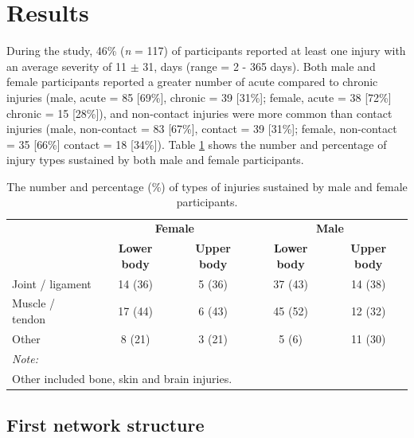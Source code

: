 \documentclass[
  english,
  man]{apa6}
\begin{document}
\hypertarget{results}{%
\section{Results}\label{results}}

During the study, 46\% (\emph{n} = 117) of participants reported at least one injury with an average severity of 11 \(\pm\) 31, days (range = 2 - 365 days).
Both male and female participants reported a greater number of acute compared to chronic injuries (male, acute = 85 {[}69\%{]}, chronic = 39 {[}31\%{]}; female, acute = 38 {[}72\%{]} chronic = 15 {[}28\%{]}), and non-contact injuries were more common than contact injuries (male, non-contact = 83 {[}67\%{]}, contact = 39 {[}31\%{]}; female, non-contact = 35 {[}66\%{]} contact = 18 {[}34\%{]}).
Table \ref{tab:table4} shows the number and percentage of injury types sustained by both male and female participants.

\begin{table}[H]

\caption{\label{tab:table4}The number and percentage (\%) of types of injuries sustained by male and female participants.}
\centering
\begin{tabular}[t]{l|c|c|c|c}
\hline
\multicolumn{1}{c|}{\textbf{ }} & \multicolumn{2}{c|}{\textbf{Female}} & \multicolumn{2}{c}{\textbf{Male}} \\
\cline{2-3} \cline{4-5}
\textbf{} & \textbf{Lower body} & \textbf{Upper body} & \textbf{Lower body} & \textbf{Upper body}\\
\hline
Joint / ligament & 14 (36) & 5 (36) & 37 (43) & 14 (38)\\
\hline
Muscle / tendon & 17 (44) & 6 (43) & 45 (52) & 12 (32)\\
\hline
Other & 8 (21) & 3 (21) & 5 (6) & 11 (30)\\
\hline
\multicolumn{5}{l}{\textit{Note: }}\\
\multicolumn{5}{l}{Other included bone, skin and brain injuries.}\\
\end{tabular}
\end{table}

\hypertarget{first-network-structure}{%
\subsection{First network structure}\label{first-network-structure}}
\end{document}
